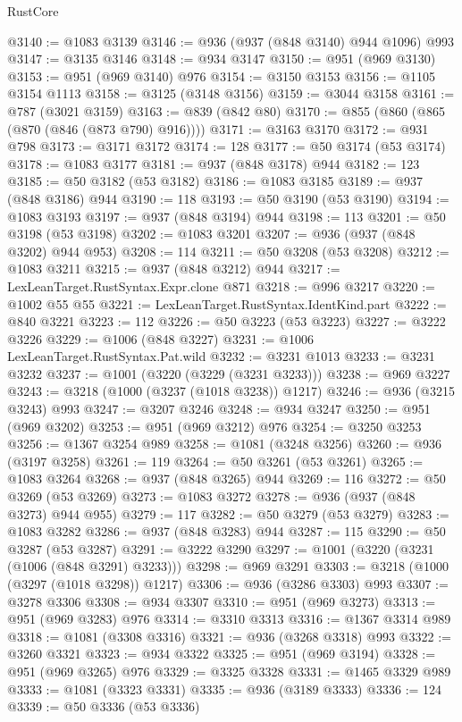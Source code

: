\begin{lexlean}{RustCore}
\begin{coremodule}
@3140 := @1083 @3139
@3146 := @936 (@937 (@848 @3140) @944 @1096) @993
@3147 := @3135 @3146
@3148 := @934 @3147
@3150 := @951 (@969 @3130)
@3153 := @951 (@969 @3140) @976
@3154 := @3150 @3153
@3156 := @1105 @3154 @1113
@3158 := @3125 (@3148 @3156)
@3159 := @3044 @3158
@3161 := @787 (@3021 @3159)
@3163 := @839 (@842 @80)
@3170 := @855 (@860 (@865 (@870 (@846 (@873 @790) @916))))
@3171 := @3163 @3170
@3172 := @931 @798
@3173 := @3171 @3172
@3174 := 128
@3177 := @50 @3174 (@53 @3174)
@3178 := @1083 @3177
@3181 := @937 (@848 @3178) @944
@3182 := 123
@3185 := @50 @3182 (@53 @3182)
@3186 := @1083 @3185
@3189 := @937 (@848 @3186) @944
@3190 := 118
@3193 := @50 @3190 (@53 @3190)
@3194 := @1083 @3193
@3197 := @937 (@848 @3194) @944
@3198 := 113
@3201 := @50 @3198 (@53 @3198)
@3202 := @1083 @3201
@3207 := @936 (@937 (@848 @3202) @944 @953)
@3208 := 114
@3211 := @50 @3208 (@53 @3208)
@3212 := @1083 @3211
@3215 := @937 (@848 @3212) @944
@3217 := LexLeanTarget.RustSyntax.Expr.clone @871
@3218 := @996 @3217
@3220 := @1002 @55 @55
@3221 := LexLeanTarget.RustSyntax.IdentKind.part
@3222 := @840 @3221
@3223 := 112
@3226 := @50 @3223 (@53 @3223)
@3227 := @3222 @3226
@3229 := @1006 (@848 @3227)
@3231 := @1006 LexLeanTarget.RustSyntax.Pat.wild
@3232 := @3231 @1013
@3233 := @3231 @3232
@3237 := @1001 (@3220 (@3229 (@3231 @3233)))
@3238 := @969 @3227
@3243 := @3218 (@1000 (@3237 (@1018 @3238)) @1217)
@3246 := @936 (@3215 @3243) @993
@3247 := @3207 @3246
@3248 := @934 @3247
@3250 := @951 (@969 @3202)
@3253 := @951 (@969 @3212) @976
@3254 := @3250 @3253
@3256 := @1367 @3254 @989
@3258 := @1081 (@3248 @3256)
@3260 := @936 (@3197 @3258)
@3261 := 119
@3264 := @50 @3261 (@53 @3261)
@3265 := @1083 @3264
@3268 := @937 (@848 @3265) @944
@3269 := 116
@3272 := @50 @3269 (@53 @3269)
@3273 := @1083 @3272
@3278 := @936 (@937 (@848 @3273) @944 @955)
@3279 := 117
@3282 := @50 @3279 (@53 @3279)
@3283 := @1083 @3282
@3286 := @937 (@848 @3283) @944
@3287 := 115
@3290 := @50 @3287 (@53 @3287)
@3291 := @3222 @3290
@3297 := @1001 (@3220 (@3231 (@1006 (@848 @3291) @3233)))
@3298 := @969 @3291
@3303 := @3218 (@1000 (@3297 (@1018 @3298)) @1217)
@3306 := @936 (@3286 @3303) @993
@3307 := @3278 @3306
@3308 := @934 @3307
@3310 := @951 (@969 @3273)
@3313 := @951 (@969 @3283) @976
@3314 := @3310 @3313
@3316 := @1367 @3314 @989
@3318 := @1081 (@3308 @3316)
@3321 := @936 (@3268 @3318) @993
@3322 := @3260 @3321
@3323 := @934 @3322
@3325 := @951 (@969 @3194)
@3328 := @951 (@969 @3265) @976
@3329 := @3325 @3328
@3331 := @1465 @3329 @989
@3333 := @1081 (@3323 @3331)
@3335 := @936 (@3189 @3333)
@3336 := 124
@3339 := @50 @3336 (@53 @3336)

\end{coremodule}
\end{lexlean}

